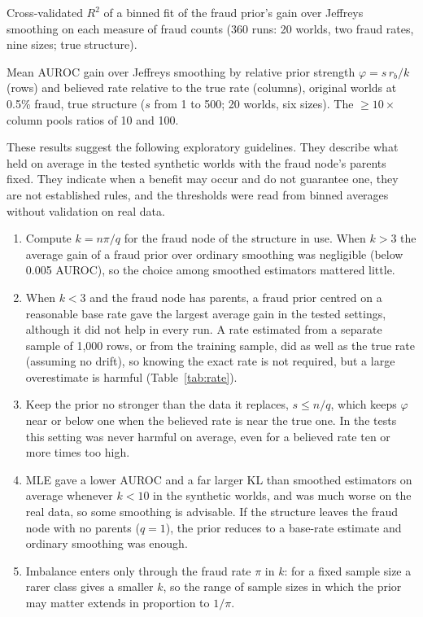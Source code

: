 \documentclass[final,5p,times,authoryear]{elsarticle}
\begin{document}
\begin{table}[H]
\centering\footnotesize
\begin{adjustbox}{max width=\linewidth}\end{adjustbox}
\caption{Cross-validated $R^2$ of a binned fit of the fraud prior's gain over Jeffreys smoothing on each measure of fraud counts (360 runs: 20 worlds, two fraud rates, nine sizes; true structure).}\label{tab:kmeas}
\end{table}

\begin{table}[H]
\centering\footnotesize
\begin{adjustbox}{max width=\linewidth}\end{adjustbox}
\caption{Mean AUROC gain over Jeffreys smoothing by relative prior strength $\varphi=s\,r_b/k$ (rows) and believed rate relative to the true rate (columns), original worlds at 0.5\% fraud, true structure ($s$ from 1 to 500; 20 worlds, six sizes). The $\ge10\times$ column pools ratios of 10 and 100.}\label{tab:strength}
\end{table}

These results suggest the following exploratory guidelines. They describe what held on average in the tested synthetic worlds with the fraud node's parents fixed. They indicate when a benefit may occur and do not guarantee one, they are not established rules, and the thresholds were read from binned averages without validation on real data.
\begin{enumerate}
\item Compute $k=n\pi/q$ for the fraud node of the structure in use. When $k>3$ the average gain of a fraud prior over ordinary smoothing was negligible (below 0.005 AUROC), so the choice among smoothed estimators mattered little.
\item When $k<3$ and the fraud node has parents, a fraud prior centred on a reasonable base rate gave the largest average gain in the tested settings, although it did not help in every run. A rate estimated from a separate sample of 1,000 rows, or from the training sample, did as well as the true rate (assuming no drift), so knowing the exact rate is not required, but a large overestimate is harmful (Table~\ref{tab:rate}).
\item Keep the prior no stronger than the data it replaces, $s\le n/q$, which keeps $\varphi$ near or below one when the believed rate is near the true one. In the tests this setting was never harmful on average, even for a believed rate ten or more times too high.
\item MLE gave a lower AUROC and a far larger KL than smoothed estimators on average whenever $k<10$ in the synthetic worlds, and was much worse on the real data, so some smoothing is advisable. If the structure leaves the fraud node with no parents ($q=1$), the prior reduces to a base-rate estimate and ordinary smoothing was enough.
\item Imbalance enters only through the fraud rate $\pi$ in $k$: for a fixed sample size a rarer class gives a smaller $k$, so the range of sample sizes in which the prior may matter extends in proportion to $1/\pi$.
\end{enumerate}
\end{document}
